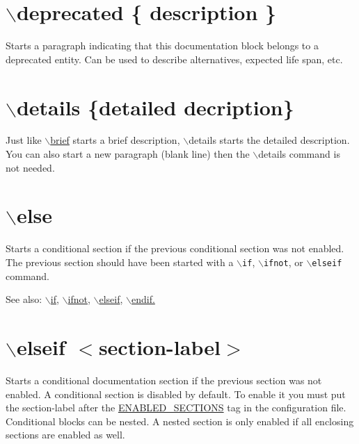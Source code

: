  \hypertarget{commands_cmddeprecated}{}\section{$\backslash$deprecated \{ description \}}\label{commands_cmddeprecated}
 Starts a paragraph indicating that this documentation block belongs to a deprecated entity. Can be used to describe alternatives, expected life span, etc.



 \hypertarget{commands_cmddetails}{}\section{$\backslash$details \{detailed decription\}}\label{commands_cmddetails}
 Just like \hyperlink{commands_cmdbrief}{$\backslash$brief} starts a brief description, $\backslash$details starts the detailed description. You can also start a new paragraph (blank line) then the $\backslash$details command is not needed.



 \hypertarget{commands_cmdelse}{}\section{$\backslash$else}\label{commands_cmdelse}
 Starts a conditional section if the previous conditional section was not enabled. The previous section should have been started with a {\tt $\backslash$if}, {\tt $\backslash$ifnot}, or {\tt $\backslash$elseif} command.

\begin{Desc}
\item[See also:]\hyperlink{commands_cmdif}{$\backslash$if}, \hyperlink{commands_cmdifnot}{$\backslash$ifnot}, \hyperlink{commands_cmdelseif}{$\backslash$elseif}, \hyperlink{commands_cmdendif}{$\backslash$endif.}\end{Desc}


 \hypertarget{commands_cmdelseif}{}\section{$\backslash$elseif $<$section-label$>$}\label{commands_cmdelseif}
 Starts a conditional documentation section if the previous section was not enabled. A conditional section is disabled by default. To enable it you must put the section-label after the \hyperlink{config_cfg_enabled_sections}{ENABLED\_\-SECTIONS} tag in the configuration file. Conditional blocks can be nested. A nested section is only enabled if all enclosing sections are enabled as well.


